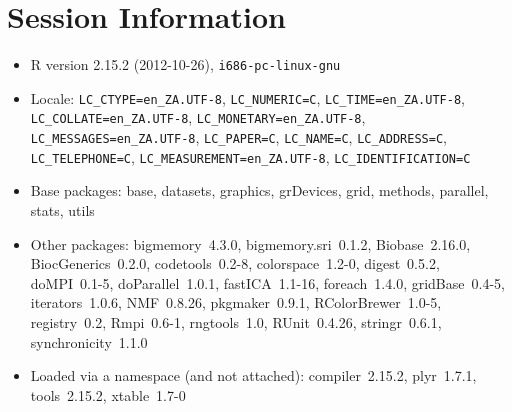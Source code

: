 \documentclass[10pt]{article}
\begin{document}
\section*{Session Information}
\begin{itemize}\raggedright
  \item R version 2.15.2 (2012-10-26), \verb|i686-pc-linux-gnu|
  \item Locale: \verb|LC_CTYPE=en_ZA.UTF-8|, \verb|LC_NUMERIC=C|, \verb|LC_TIME=en_ZA.UTF-8|, \verb|LC_COLLATE=en_ZA.UTF-8|, \verb|LC_MONETARY=en_ZA.UTF-8|, \verb|LC_MESSAGES=en_ZA.UTF-8|, \verb|LC_PAPER=C|, \verb|LC_NAME=C|, \verb|LC_ADDRESS=C|, \verb|LC_TELEPHONE=C|, \verb|LC_MEASUREMENT=en_ZA.UTF-8|, \verb|LC_IDENTIFICATION=C|
  \item Base packages: base, datasets, graphics, grDevices, grid,
    methods, parallel, stats, utils
  \item Other packages: bigmemory~4.3.0, bigmemory.sri~0.1.2,
    Biobase~2.16.0, BiocGenerics~0.2.0, codetools~0.2-8,
    colorspace~1.2-0, digest~0.5.2, doMPI~0.1-5, doParallel~1.0.1,
    fastICA~1.1-16, foreach~1.4.0, gridBase~0.4-5, iterators~1.0.6,
    NMF~0.8.26, pkgmaker~0.9.1, RColorBrewer~1.0-5, registry~0.2,
    Rmpi~0.6-1, rngtools~1.0, RUnit~0.4.26, stringr~0.6.1,
    synchronicity~1.1.0
  \item Loaded via a namespace (and not attached): compiler~2.15.2,
    plyr~1.7.1, tools~2.15.2, xtable~1.7-0
\end{itemize}
\end{document}

